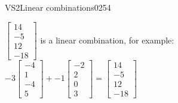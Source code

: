 \begin{exercise}{VS2}{Linear combinations}{0254}
\begin{exerciseAnswer}
\begin{itemize}
 

 \(\left[\begin{array}{c}
14 \\
-5 \\
12 \\
-18
\end{array}\right]\) is a linear combination, for example: \(
-3 \left[\begin{array}{c}
-4 \\
1 \\
-4 \\
5
\end{array}\right] + -1 \left[\begin{array}{c}
-2 \\
2 \\
0 \\
3
\end{array}\right] = \left[\begin{array}{c}
14 \\
-5 \\
12 \\
-18
\end{array}\right]
                            \) 

 
\end{itemize}

     \end{exerciseAnswer}
 \end{exercise}


\newpage





